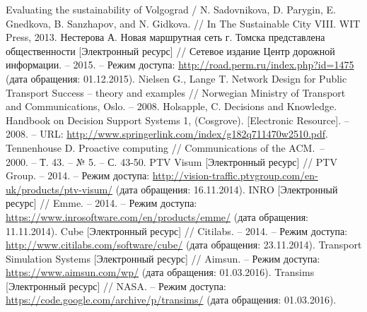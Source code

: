 \renewcommand{\bibname}{%
    \vspace{-2em}\begin{center}
        Список используемой литературы
    \end{center}\vspace{-2em}
}

\pagestyle{empty}

\begin{thebibliography}{10}
     Evaluating the sustainability of Volgograd / N. Sadovnikova, D. Parygin, E. Gnedkova, 
        B. Sanzhapov, and N. Gidkova. // In The Sustainable City VIII. WIT Press, 2013.
     Нестерова А. Новая маршрутная сеть г. Томска представлена общественности 
        [Электронный ресурс] // Сетевое издание Центр дорожной информации. -- 2015. -- Режим доступа: 
        \url{http://road.perm.ru/index.php?id=1475} (дата обращения: 01.12.2015).
     Nielsen G., Lange T. Network Design for Public Transport Success -- theory and 
        examples // Norwegian Ministry of Transport and Communications, Oslo. -- 2008.
     Holsapple, C. Decisions and Knowledge. Handbook on Decision Support Systems 1, 
        (Cosgrove). [Electronic Resource]. -- 2008. -- URL: 
        \url{http://www.springerlink.com/index/g182q711470w2510.pdf}.
     Tennenhouse D. Proactive computing //
        Communications of the ACM.~--\\2000. -- Т. 43. -- № 5. -- С. 43-50.
     PTV Visum [Электронный ресурс] // PTV Group. -- 2014. -- Режим доступа: 
        \url{http://vision-traffic.ptvgroup.com/en-uk/products/ptv-visum/} 
        (дата обращения: 16.11.2014).
     INRO [Электронный ресурс] // Emme. -- 2014. -- Режим доступа:\\
        \url{https://www.inrosoftware.com/en/products/emme/} (дата обращения: 11.11.2014).
     Cube [Электронный ресурс] // Citilabs. -- 2014. -- Режим доступа:\\
        \url{http://www.citilabs.com/software/cube/} (дата обращения: 23.11.2014).
     Transport Simulation Systems [Электронный ресурс] // Aimsun. -- Режим доступа: 
        \url{https://www.aimsun.com/wp/} (дата обращения: 01.03.2016).
     Transims [Электронный ресурс] // NASA. -- Режим доступа:\\
        \url{https://code.google.com/archive/p/transims/} (дата обращения: 01.03.2016).

\end{thebibliography}
